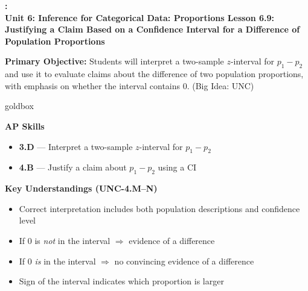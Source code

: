 \documentclass[10pt]{article}
\newcommand{\UnitNumberName}{Unit 6: Inference for Categorical Data: Proportions \quad}
\newcommand{\LessonNumberName}{Lesson 6.9: Justifying a Claim Based on a Confidence Interval for a Difference of Population Proportions}
\begin{document}
\begin{center}
    {\Large\bfseries \CourseName: \SchoolYear \\
    {\small\bfseries \UnitNumberName \LessonNumberName}}
\end{center}

\begin{tcolorbox}[colback=sky, colframe=navy, boxrule=0.9pt, arc=2mm,
    left=2mm, right=2mm, top=1.5mm, bottom=1.5mm]
    \textbf{Primary Objective:} Students will interpret a two-sample $z$-interval for
    $p_1 - p_2$ and use it to evaluate claims about the difference of two population proportions,
    with emphasis on whether the interval contains 0. (Big Idea: UNC)
\end{tcolorbox}

\renewcommand{\arraystretch}{1.6}
\begin{skillbox}{goldbox}
    \begin{minipage}[t]{0.48\linewidth}\vspace{0pt}
        \textbf{AP Skills}
        \begin{itemize}[leftmargin=1.2em]
            \item \textbf{3.D} --- Interpret a two-sample $z$-interval for $p_1-p_2$
            \item \textbf{4.B} --- Justify a claim about $p_1-p_2$ using a CI
        \end{itemize}
    \end{minipage}\hfill
    \begin{minipage}[t]{0.48\linewidth}\vspace{0pt}
        \textbf{Key Understandings (UNC-4.M--N)}
        \begin{itemize}[leftmargin=1.2em]
            \item Correct interpretation includes both population descriptions and confidence level
            \item If 0 is \textit{not} in the interval $\Rightarrow$ evidence of a difference
            \item If 0 \textit{is} in the interval $\Rightarrow$ no convincing evidence of a difference
            \item Sign of the interval indicates which proportion is larger
        \end{itemize}
    \end{minipage}
\end{skillbox}
\end{document}
